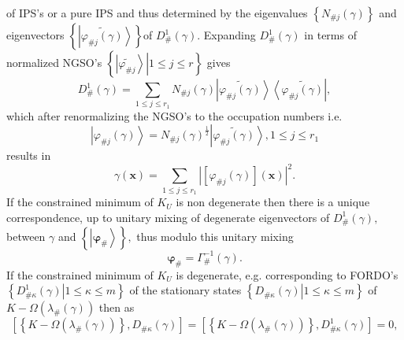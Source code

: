 \documentclass[aps,preprint]{revtex4}%
\begin{document}
of IPS's or a pure IPS and thus determined by the eigenvalues $\left\{
N_{\#j}\left(  \gamma\right)  \right\}  $ and eigenvectors $\left\{
\left\vert \widetilde{\varphi_{\#j}\left(  \gamma\right)  }\right\rangle
\right\}  $of $D_{\#}^{1}\left(  \gamma\right)  $. Expanding $D_{\#}%
^{1}\left(  \gamma\right)  $ in terms of normalized NGSO's $\left\{  \left.
\left\vert \widetilde{\varphi_{\#j}}\right\rangle \right\vert 1\leq j\leq
r\right\}  $ gives
\begin{equation}
D_{\#}^{1}\left(  \gamma\right)  =\sum_{1\leq j\leq r_{1}}N_{\#j}\left(
\gamma\right)  \left\vert \widetilde{\varphi_{\#j}\left(  \gamma\right)
}\right\rangle \left\langle \widetilde{\varphi_{\#j}\left(  \gamma\right)
}\right\vert ,
\end{equation}
which after renormalizing the NGSO's to the occupation numbers i.e.
\begin{equation}
\left\vert \varphi_{\#j}\left(  \gamma\right)  \right\rangle =N_{\#j}\left(
\gamma\right)  ^{\frac{1}{2}}\left\vert \widetilde{\varphi_{\#j}\left(
\gamma\right)  }\right\rangle ,1\leq j\leq r_{1}%
\end{equation}
results in
\begin{equation}
\gamma\left(  \mathbf{x}\right)  =\sum_{1\leq j\leq r_{1}}\left\vert \left[
\varphi_{\#j}\left(  \gamma\right)  \right]  \left(  \mathbf{x}\right)
\right\vert ^{2}. \label{gammaKS}%
\end{equation}
If the constrained minimum of $K_{U}$ is non degenerate then there is a unique
correspondence, up to unitary mixing of degenerate eigenvectors of $D_{\#}%
^{1}\left(  \gamma\right)  ,$ between $\gamma$ and $\left\{  \left\vert
\mathbf{\varphi}_{\#}\right\rangle \right\}  ,$ thus modulo this unitary
mixing
\begin{equation}
\mathbf{\varphi}_{\#}=\Gamma_{\#}^{-1}\left(  \gamma\right)  .
\end{equation}
If the constrained minimum of $K_{U}$ is degenerate, e.g. corresponding to
FORDO's $\left\{  \left.  D_{\#\kappa}^{1}\left(  \gamma\right)  \right\vert
1\leq\kappa\leq m\right\}  $ of the stationary states $\left\{  \left.
D_{\#\kappa}\left(  \gamma\right)  \right\vert 1\leq\kappa\leq m\right\}  $ of
$K-\Omega\left(  \lambda_{\#}\left(  \gamma\right)  \right)  $ then as
\begin{equation}
\left[  \left\{  K-\Omega\left(  \lambda_{\#}\left(  \gamma\right)  \right)
\right\}  ,D_{\#\kappa}\left(  \gamma\right)  \right]  =\left[  \left\{
K-\Omega\left(  \lambda_{\#}\left(  \gamma\right)  \right)  \right\}
,D_{\#\kappa}^{1}\left(  \gamma\right)  \right]  =0,
\end{equation}
\end{document}
